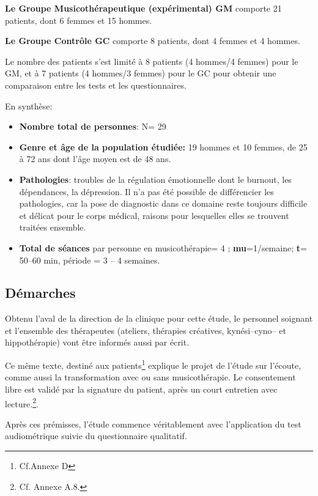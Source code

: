 \textbf{Le Groupe Musicothérapeutique (expérimental) GM} comporte 21
patients, dont 6
femmes et 15 hommes.

\textbf{Le  Groupe Contrôle GC} comporte 8 patients, dont 4 femmes et 4 hommes.

Le nombre
des patients s'est limité  à 8
patients (4 hommes/4 femmes) pour le GM, et à 7 patients (4 hommes/3
femmes) pour le GC pour obtenir une comparaison entre les tests et les questionnaires.




En synthèse:
 \begin{itemize}
 
 \item \textbf{Nombre total de personnes}: N= 29 
\item\textbf{Genre et âge de la population étudiée:}  19 hommes et 10 femmes, de 25 à 72
  ans dont l'âge moyen est de 48 ans.
 \item\textbf{Pathologies}: troubles de la régulation émotionnelle
   dont le burnout, les dépendances, la dépression.
   Il n'a pas été
   possible de différencier les pathologies, car la pose de
   diagnostic dans ce domaine reste toujours difficile et délicat pour le corps médical, raisons pour lesquelles elles
   se trouvent traitées ensemble.
 \item \textbf{Total de séances} par personne en
   musicothérapie= 4 ;   \textbf{mu}=1/semaine;  
 \textbf{t}= 50--60 min, période = 3 -- 4 semaines.
\end{itemize}




\subsection{Démarches}
Obtenu l'aval de la direction de la
clinique pour cette étude,  le personnel soignant et l'ensemble des
thérapeutes (ateliers, thérapies créatives, kynési--cyno--
et hippothérapie) vont être informés aussi par écrit.

Ce même texte, destiné aux
patients\footnote{Cf.Annexe D} explique le projet de l'étude sur l'écoute, comme aussi la transformation
avec ou sans musicothérapie.
Le consentement libre est validé par la signature du patient, après
un court entretien avec lecture.\footnote{Cf. Annexe A.8.}.


Après ces prémisses, l'étude commence véritablement avec l'application du test
audiométrique suivie du questionnaire qualitatif.

